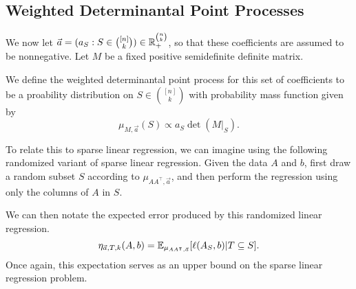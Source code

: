 \documentclass{amsart}
\theoremstyle{definition}
\numberwithin{equation}{section}
\begin{document}
\subsection{Weighted Determinantal Point Processes}
We now let $\vec{a} = (a_S : S \in \binom{[n]}{k}) \in \mathbb{R}_+^{\binom{n}{k}}$, so that these coefficients are assumed to be nonnegative.
Let $M$ be a fixed positive semidefinite definite matrix.

We define the weighted determinantal point process for this set of coefficients to be a proability distribution on $S \in \binom{[n]}{k}$ with probability mass function given by
\[
    \mu_{M, \vec{a}}(S) \propto a_S \det(M|_S).
\]

To relate this to sparse linear regression, we can imagine using the following randomized variant of sparse linear regression.
Given the data $A$ and $b$, first draw a random subset $S$ according to $\mu_{AA^{\intercal}, \vec{a}}$, and then perform the regression using only the columns of $A$ in $S$.

We can then notate the expected error produced by this randomized linear regression.
\[
    \eta_{\vec{a}, T, k}(A,b) = \mathbb{E}_{\mu_{AA^{\intercal},\vec{a}}} [\ell(A_S, b) | T \subseteq S].
\]
Once again, this expectation serves as an upper bound on the sparse linear regression problem.
\end{document}
